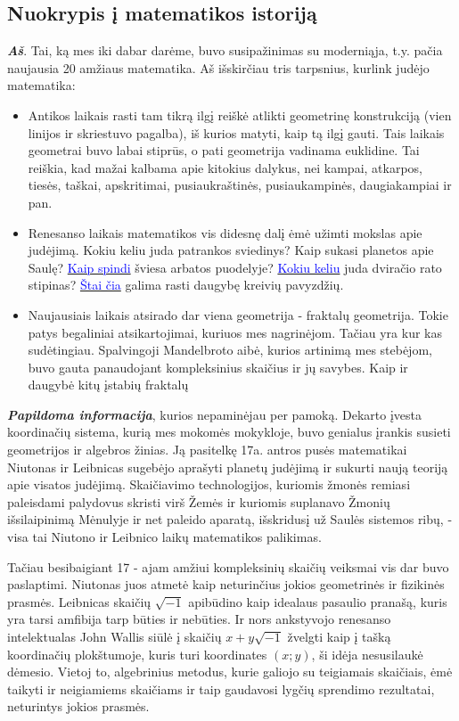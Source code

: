 \documentclass[a4paper]{article}
\newcommand{\goto}[2]{\href{\detokenize{#1}}{\textcolor{blue}{#2}}}
\newcommand{\say}[1]{\textbf{\textit{#1}}}
\begin{document}
 \subsection*{Nuokrypis į matematikos istoriją}
 \say{Aš}. Tai, ką mes iki dabar darėme, buvo susipažinimas su moderniąja, t.y. pačia naujausia 20 amžiaus matematika. Aš išskirčiau tris tarpsnius, kurlink judėjo matematika:
 \begin{itemize}
 \item Antikos laikais rasti tam tikrą ilgį reiškė atlikti geometrinę konstrukciją (vien linijos ir skriestuvo pagalba), iš kurios matyti, kaip tą ilgį gauti. Tais laikais geometrai buvo labai stiprūs, o pati geometrija vadinama euklidine. Tai reiškia, kad mažai kalbama apie kitokius dalykus, nei kampai, atkarpos, tiesės, taškai, apskritimai, pusiaukraštinės, pusiaukampinės, daugiakampiai ir pan.
 \item Renesanso laikais matematikos vis didesnę dalį ėmė užimti mokslas apie judėjimą. Kokiu keliu juda patrankos sviedinys? Kaip sukasi planetos apie Saulę? \goto{https://en.wikipedia.org/wiki/Cardioid}{Kaip spindi} šviesa arbatos puodelyje? \goto{https://en.wikipedia.org/wiki/Cycloid}{Kokiu keliu} juda dviračio rato stipinas? \goto{https://en.wikipedia.org/wiki/List_of_curves}{Štai čia} galima rasti daugybę kreivių pavyzdžių.
 \item Naujausiais laikais atsirado dar viena geometrija - fraktalų geometrija. Tokie patys begaliniai atsikartojimai, kuriuos mes nagrinėjom. Tačiau yra kur kas sudėtingiau. Spalvingoji Mandelbroto aibė, kurios artinimą mes stebėjom, buvo gauta panaudojant kompleksinius skaičius ir jų savybes. Kaip ir daugybė kitų įstabių fraktalų
 \end{itemize}
 
 \say{Papildoma informacija}, kurios nepaminėjau per pamoką. Dekarto įvesta koordinačių sistema, kurią mes mokomės mokykloje, buvo genialus įrankis susieti geometrijos ir algebros žinias. Ją pasitelkę 17a. antros pusės matematikai Niutonas ir Leibnicas sugebėjo aprašyti planetų judėjimą ir sukurti naują teoriją apie visatos judėjimą. Skaičiavimo technologijos, kuriomis žmonės remiasi paleisdami palydovus skristi virš Žemės ir kuriomis suplanavo Žmonių išsilaipinimą Mėnulyje ir net paleido aparatą, išskridusį už Saulės sistemos ribų, - visa tai Niutono ir Leibnico laikų matematikos palikimas.
 
 Tačiau besibaigiant 17 - ajam amžiui kompleksinių skaičių veiksmai vis dar buvo paslaptimi. Niutonas juos atmetė kaip neturinčius jokios geometrinės ir fizikinės prasmės. Leibnicas skaičių $\sqrt{-1}$ apibūdino kaip idealaus pasaulio pranašą, kuris yra tarsi amfibija tarp būties ir nebūties. Ir nors ankstyvojo renesanso intelektualas John Wallis siūlė į skaičių $x+y\sqrt{-1}$ žvelgti kaip į tašką koordinačių plokštumoje, kuris turi koordinates $(x; y)$, ši idėja nesusilaukė dėmesio. Vietoj to, algebrinius metodus, kurie galiojo su teigiamais skaičiais, ėmė taikyti ir neigiamiems skaičiams ir taip gaudavosi lygčių sprendimo rezultatai, neturintys jokios prasmės. 
 
\end{document}

